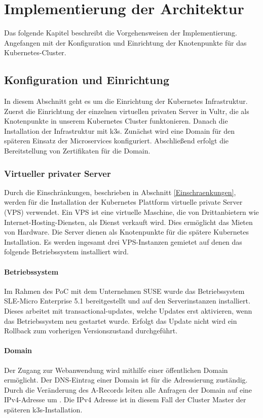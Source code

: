 \chapter{Implementierung der Architektur}

Das folgende Kapitel beschreibt die Vorgehensweisen der Implementierung.
Angefangen mit der Konfiguration und Einrichtung der Knotenpunkte für das Kubernetes-Cluster.


\section{Konfiguration und Einrichtung}

In diesem Abschnitt geht es um die Einrichtung der Kubernetes Infrastruktur.
Zuerst die Einrichtung der einzelnen virtuellen privaten Server in Vultr, die als Knotenpunkte in unserem Kubernetes Cluster funktonieren.
Danach die Installation der Infrastruktur mit k3s.
Zunächst wird eine Domain für den späteren Einsatz der Microservices konfiguriert.
Abschließend erfolgt die Bereitstellung von Zertifikaten für die Domain.

\subsection{Virtueller privater Server}

Durch die Einschränkungen, beschrieben in Abschnitt \ref{Einschraenkungen},
werden für die Installation der Kubernetes Plattform virtuelle private Server (VPS) verwendet.
Ein VPS ist eine virtuelle Maschine, die von Drittanbietern wie Internet-Hosting-Diensten, als Dienst verkauft wird.
Dies ermöglicht das Mieten von Hardware.
Die Server dienen als Knotenpunkte für die spätere Kubernetes Installation.
Es werden ingesamt drei VPS-Instanzen gemietet auf denen das folgende Betriebssystem installiert wird.

\subsubsection{Betriebssystem}
Im Rahmen des PoC mit dem Unternehmen SUSE wurde das 
Betriebssystem SLE-Micro Enterprise 5.1 bereitgestellt und auf den Serverinstanzen installiert.
Dieses arbeitet mit transactional-updates, welche Updates erst aktivieren, wenn das Betriebssystem neu gestartet wurde. 
Erfolgt das Update nicht wird ein Rollback zum vorherigen Versionszustand durchgeführt.

\subsubsection{Domain}
Der Zugang zur Webanwendung wird mithilfe einer öffentlichen Domain ermöglicht.
Der DNS-Eintrag einer Domain ist für die Adressierung zuständig.
Durch die Veränderung des A-Records leiten alle Anfragen der Domain auf eine IPv4-Adresse um \cite{LearningCoreDNS}.
Die IPv4 Adresse ist in diesem Fall der Cluster Master der späteren k3s-Installation.

